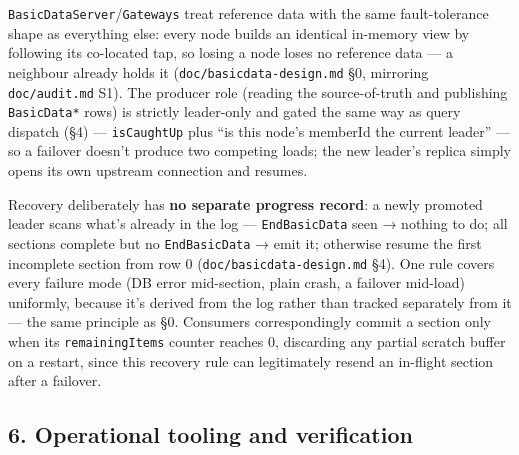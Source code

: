 \documentclass[
  10pt,
]{article}
\begin{document}
\texttt{BasicDataServer}/\texttt{Gateways} treat reference data with the
same fault-tolerance shape as everything else: every node builds an
identical in-memory view by following its co-located tap, so losing a
node loses no reference data --- a neighbour already holds it
(\texttt{doc/basicdata-design.md} §0, mirroring \texttt{doc/audit.md}
S1). The producer role (reading the source-of-truth and publishing
\texttt{BasicData*} rows) is strictly leader-only and gated the same way
as query dispatch (§4) --- \texttt{isCaughtUp} plus ``is this node's
memberId the current leader'' --- so a failover doesn't produce two
competing loads; the new leader's replica simply opens its own upstream
connection and resumes.

Recovery deliberately has \textbf{no separate progress record}: a newly
promoted leader scans what's already in the log ---
\texttt{EndBasicData} seen → nothing to do; all sections complete but no
\texttt{EndBasicData} → emit it; otherwise resume the first incomplete
section from row 0 (\texttt{doc/basicdata-design.md} §4). One rule
covers every failure mode (DB error mid-section, plain crash, a failover
mid-load) uniformly, because it's derived from the log rather than
tracked separately from it --- the same principle as §0. Consumers
correspondingly commit a section only when its \texttt{remainingItems}
counter reaches 0, discarding any partial scratch buffer on a restart,
since this recovery rule can legitimately resend an in-flight section
after a failover.

\subsection{6. Operational tooling and
verification}\label{operational-tooling-and-verification}
\end{document}
